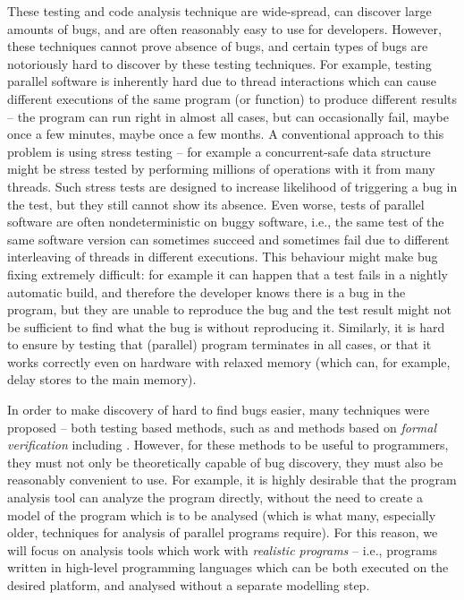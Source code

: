 These testing and code analysis technique are wide-spread, can discover large amounts of bugs, and are often reasonably easy to use for developers.
However, these techniques cannot prove absence of bugs, and certain types of bugs are notoriously hard to discover by these testing techniques.
For example, testing parallel software is inherently hard due to thread interactions which can cause different executions of the same program (or function) to produce different results -- the program can run right in almost all cases, but can occasionally fail, maybe once a few minutes, maybe once a few months.
A conventional approach to this problem is using stress testing -- for example a concurrent-safe data structure might be stress tested by performing millions of operations with it from many threads.
Such stress tests are designed to increase likelihood of triggering a bug in the test, but they still cannot show its absence.
Even worse, tests of parallel software are often nondeterministic on buggy software, i.e., the same test of the same software version can sometimes succeed and sometimes fail due to different interleaving of threads in different executions.
This behaviour might make bug fixing extremely difficult: for example it can happen that a test fails in a nightly automatic build, and therefore the developer knows there is a bug in the program, but they are unable to reproduce the bug and the test result might not be sufficient to find what the bug is without reproducing it.
Similarly, it is hard to ensure by testing that (parallel) program terminates in all cases, or that it works correctly even on hardware with relaxed memory (which can, for example, delay stores to the main memory).

In order to make discovery of hard to find bugs easier, many techniques were proposed -- both testing based methods, such as  and methods based on \emph{formal verification} including .
However, for these methods to be useful to programmers, they must not only be theoretically capable of bug discovery, they must also be reasonably convenient to use.
For example, it is highly desirable that the program analysis tool can analyze the program directly, without the need to create a model of the program which is to be analysed (which is what many, especially older, techniques for analysis of parallel programs require).
For this reason, we will focus on analysis tools which work with \emph{realistic programs} -- i.e., programs written in high-level programming languages which can be both executed on the desired platform, and analysed without a separate modelling step.

